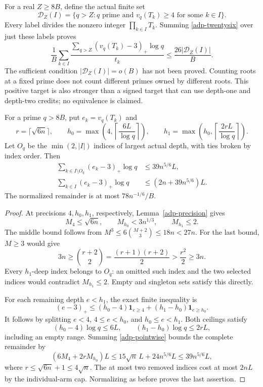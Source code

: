 For a real \(Z\geq8B\), define the actual finite set
\[
 \mathcal D_Z(I)=\{q>Z:q\text{ prime and }v_q(T_k)\geq4
                         \text{ for some }k\in I\}.
\]
Every label divides the nonzero integer \(\prod_{k\in I}T_k\).
Summing \eqref{adp-twentysix} over just these labels proves
\begin{equation}\label{adp-far-card}
 \frac1B\sum_{k\in I}
  \frac{\sum_{q>Z}(v_q(T_k)-3)_+\log q}{t_k}
 \leq\frac{26|\mathcal D_Z(I)|}{B}.
\end{equation}
The sufficient condition \(|\mathcal D_Z(I)|=o(B)\) has not been
proved. Counting roots at a fixed prime does not count different
primes owned by different roots. This positive target is also
stronger than a signed target that can use depth-one and depth-two
credits; no equivalence is claimed.

\begin{theorem}
\label{adp-two-owners}
For a prime \(q>8B\), put \(e_k=v_q(T_k)\) and
\[
 r=\lceil\sqrt{6n}\rceil,\qquad
 h_0=\max\left(4,\left\lceil\frac{6L}{\log q}\right\rceil\right),
 \qquad
 h_1=\max\left(h_0,\left\lceil\frac{2rL}{\log q}\right\rceil\right).
\]
Let \(O_q\) be the \(\min(2,|I|)\) indices of largest actual depth,
with ties broken by index order. Then
\begin{align}
 \sum_{k\in I\setminus O_q}(e_k-3)_+\log q
       &\leq39n^{5/6}L, \label{adp-remainder}\\
 \sum_{k\in I}(e_k-3)_+\log q
       &\leq(2n+39n^{5/6})L. \label{adp-two-full}
\end{align}
The normalized remainder is at most \(78n^{-1/6}/B\).
\end{theorem}
\begin{proof}
At precisions \(4,h_0,h_1\), respectively, Lemma~\ref{adp-precision}
gives
\[
 M_4\leq\sqrt{6n},\qquad M_{h_0}<3n^{1/3},\qquad M_{h_1}\leq2.
\]
The middle bound follows from
\(M^3\leq6\binom{M+2}{3}\leq18n<27n\).
For the last bound, \(M\geq3\) would give
\[
 3n\geq\binom{r+2}{2}
       =\frac{(r+1)(r+2)}2>\frac{r^2}2\geq3n.
\]
Every \(h_1\)-deep index belongs to \(O_q\): an omitted such index
and the two selected indices would contradict \(M_{h_1}\leq2\).
Empty and singleton sets satisfy this directly.

For each remaining depth \(e<h_1\), the exact finite inequality is
\begin{equation}\label{adp-pointwise}
 (e-3)_+\leq(h_0-4)\mathbf1_{e\geq4}
                   +(h_1-h_0)\mathbf1_{e\geq h_0}.
\end{equation}
It follows by splitting \(e<4\), \(4\leq e<h_0\), and
\(h_0\leq e<h_1\). Both ceilings satisfy
\[
 (h_0-4)\log q\leq6L,\qquad
 (h_1-h_0)\log q\leq2rL,
\]
including an empty range. Summing \eqref{adp-pointwise} bounds the
complete remainder by
\[
 (6M_4+2rM_{h_0})L
 \leq15\sqrt n\,L+24n^{5/6}L
 \leq39n^{5/6}L,
\]
where \(r\leq\sqrt{6n}+1\leq4\sqrt n\).
The at most two removed indices cost at most \(2nL\) by the
individual-arm cap. Normalizing as before proves the last assertion.
\end{proof}

